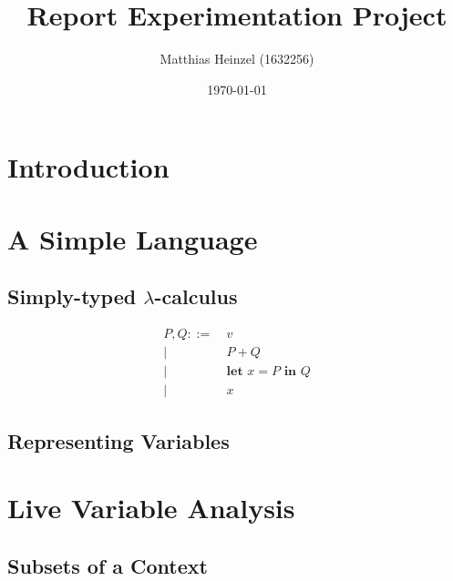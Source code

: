 \documentclass[11pt,a4paper]{article}
\title{Report Experimentation Project}
\author{Matthias Heinzel (1632256)}
\date{\today}
\begin{document}


\section{Introduction}


\section{A Simple Language}

\subsection{Simply-typed $\lambda$-calculus}

\begin{align*}
  P, Q ::=&\ v
  \\ \big|&\ P + Q
  \\ \big|&\ \textbf{let } x = P \textbf{ in } Q
  \\ \big|&\ x
\end{align*}

\subsection{Representing Variables}

\CodeLangSyntax


\section{Live Variable Analysis}

\subsection{Subsets of a Context}

\CodeSubsetSubset
\CodeSubsetOpSubseteq
\end{document}
